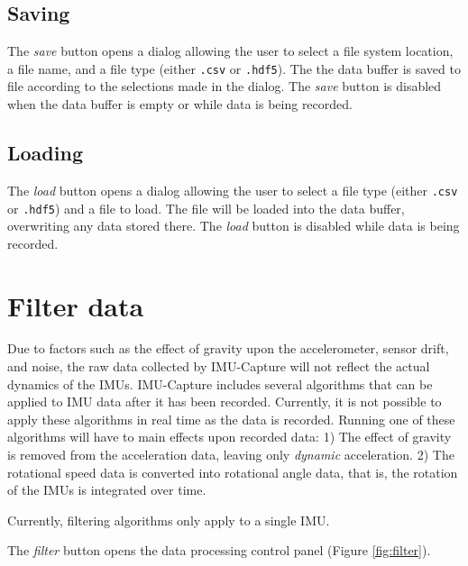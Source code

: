 \documentclass[11pt,letterpaper,article,oneside]{memoir}
\newcommand{\name}{IMU-Capture}
\newcommand{\csv}{\texttt{.csv}}
\newcommand{\hdf}{\texttt{.hdf5}}
\begin{document}
\section{Saving}

The \emph{save} button opens a dialog allowing the user to select a file system
location, a file name, and a file type (either \csv{} or \hdf{}).  The the data
buffer is saved to file according to the selections made in the dialog. The
\emph{save} button is disabled when the data buffer is empty or while data is
being recorded.

\section{Loading}

The \emph{load} button opens a dialog allowing the user to select a file type
(either \csv{} or \hdf{}) and a file to load. The file will be loaded into the
data buffer, overwriting any data stored there.  The \emph{load} button is
disabled while data is being recorded.


\chapter{Filter data}

Due to factors such as the effect of gravity upon the accelerometer, sensor
drift, and noise, the raw data collected by \name{} will not reflect the actual
dynamics of the IMUs. \name{} includes several algorithms that can be applied to
IMU data after it has been recorded. Currently, it is not possible to apply
these algorithms in real time as the data is recorded. Running one of these
algorithms will have to main effects upon recorded data: 1) The effect of
gravity is removed from the acceleration data, leaving only \emph{dynamic}
acceleration. 2) The rotational speed data is converted into rotational angle
data, that is, the rotation of the IMUs is integrated over time.

Currently, filtering algorithms only apply to a single IMU.

The \emph{filter} button opens the data processing control panel (Figure
\ref{fig:filter}).
\end{document}

